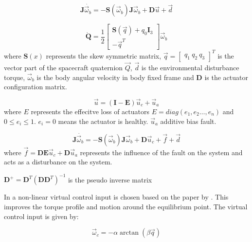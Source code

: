 \begin{equation}\mathbf{J}\dot{\vec{\omega}_{b}}=-\mathbf{S}(\vec{\omega}_{b})\mathbf{J}\vec{\omega}_{b}+\mathbf{D}\vec{u}+\vec{d}\end{equation}

\begin{equation} \dot{\mathbf{Q}}=\frac{1}{2}\begin{bmatrix}
\mathbf{S}(\vec{q})+q_{0}\mathbf{I}_{3} \\
-\vec{q}^{T}
\end{bmatrix} \vec{\omega}_{b}\end{equation}
where $\mathbf{S}(x)$ represents the skew symmetric matrix, 
$\vec{q}=\begin{bmatrix}q_{1} \ q_{2} \ q_{3} \end{bmatrix}^T$ is the vector part of the spacecraft quaternion $\vec{Q}$,
$\vec{d}$ is the environmental disturbance torque,
$\vec{\omega}_{b}$ is the body angular velocity in body fixed frame and
$\mathbf{D}$ is the actuator configuration matrix.

\begin{equation}\vec{u}=(\mathbf{I}-\mathbf{E})\vec{u}_{c}+\vec{u}_{a}\end{equation}
where $E$ represents the effecitve loss of actuators $E=diag(e_{1},e_{2}\dots,e_{n})$ and $0\leq e_{i}\leq 1$. $e_{i}=0$ means the actuator is healthy. $\vec{u}_{a}$ additive bias fault.


\begin{equation}
    \mathbf{J}\dot{\vec{\omega}_{b}}=-\mathbf{S}(\vec{\omega}_{b})\mathbf{J}\vec{\omega}_{b}+\mathbf{D}\vec{u}_{c}+\vec{f}+\vec{d}
\end{equation} 
where $\vec{f}=\mathbf{D}\mathbf{E}\vec{u}_{c}+\mathbf{D}\vec{u}_{a}$ represents the influence of the fault on the system and acts as a disturbance on the system.



$\mathbf{D}^+=\mathbf{D}^T(\mathbf{D}\mathbf{D}^T)^{-1}$ is the pseudo inverse matrix

In \cite{shenActiveFaulttolerantControl2019} a non-linear virtual control input is chosen based on the paper by \cite{kimRobustBacksteppingControl2003}. This improves the torque profile and motion around the equilibrium point. The virtual control input is given by:

\begin{equation}\vec{\omega}_{c}=-\alpha\arctan(\beta\vec{q})\end{equation}


